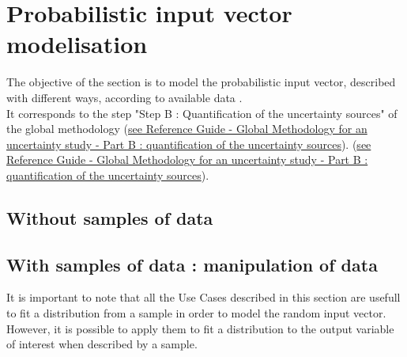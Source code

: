 \newpage \section{Probabilistic input vector modelisation}


The objective of the section is to model the probabilistic input vector, described with different ways, according to available data .\\
It corresponds to the step "Step B : Quantification of the uncertainty sources" of the global methodology
\ifpdf
(\href{OpenTURNS_ReferenceGuide.pdf}{see Reference Guide - Global Methodology for an uncertainty study - Part B : quantification of the uncertainty sources}).
\else
(\href{../ReferenceGuide/index.xhtml}{see Reference Guide - Global Methodology for an uncertainty study - Part B : quantification of the uncertainty sources}).
\fi




\newpage \subsection{Without samples of data}



\newpage 
\newpage 
\newpage 
\newpage 
\newpage 

\newpage \subsection{With samples of data : manipulation of data}



It is important to note that all the Use Cases described in this section are usefull to fit a distribution from a sample in order to model the random input vector.  However, it is possible to apply them to fit a distribution to the output variable of interest when described by a sample.




\newpage 
\newpage 
\newpage 
\newpage 
\newpage 
\newpage 
\newpage 
\newpage 
\newpage 
\newpage 
\newpage 
\newpage 
\newpage 
\newpage 
\newpage 




